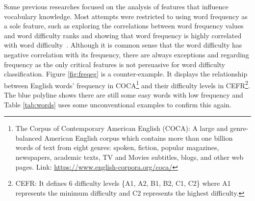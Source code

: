 Some previous researches focused on the analysis of features that influence vocabulary knowledge.
Most attempts were restricted to using word frequency as a sole feature,
such as exploring the correlations between 
word frequency values and word difficulty ranks and showing that 
word frequency is highly correlated with word difficulty~\cite{breland1996word,ryder1988relationship,chang2018learning}.
Although it is common sense that the word difficulty 
has negative correlation with its frequency, there are always 
exceptions and regarding frequency as the only critical features 
is not persuasive for word difficulty classification. 
Figure \ref{fig:freqeg} is a counter-example.
It displays the relationship between English words' frequency in COCA\footnote{The Corpus of Contemporary American English (COCA): A large and genre-balanced American English corpus
which contains more than one billion words of text from eight genres: 
spoken, fiction, popular magazines, newspapers, academic texts, TV and Movies subtitles, blogs, and other web pages. Link: \url{https://www.english-corpora.org/coca/}} 
and their difficulty levels in CEFR\footnote{CEFR: It defines 6 difficulty levels \{A1, A2, B1, B2, C1, C2\} where A1 represents the minimum difficulty and C2 represents the highest difficulty.}.
The blue polyline shows there are still some 
easy words with low frequency and Table \ref{tab:words} uses some unconventional examples to confirm this again.

